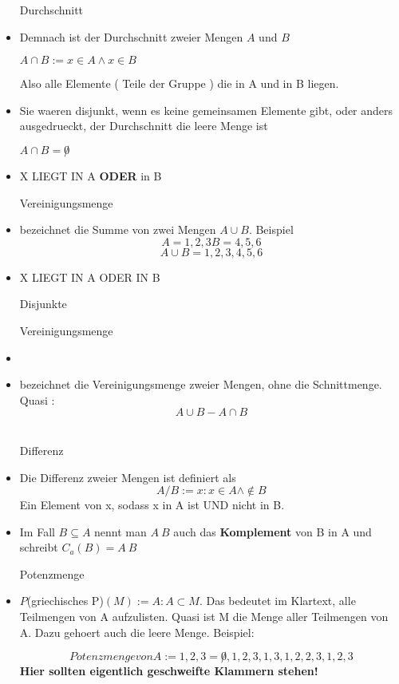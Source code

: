\documentclass[smallheadings,headsepline,12pt,a4paper]{scrartcl}
\begin{document}
\begin{itemize}
\item[Durchschnitt]
\item Demnach ist der Durchschnitt zweier Mengen $A$ und $B$ \\
\begin{center}
$ A \cap B := {x \in A \wedge x \in B } $
\end{center}
Also alle Elemente ( Teile der Gruppe ) die in A und in B liegen.
\item Sie waeren disjunkt, wenn es keine gemeinsamen Elemente gibt, oder anders ausgedrueckt, der Durchschnitt die leere Menge ist
\begin{center}
$ A \cap B = \not 0 $
\end{center}
\item X LIEGT IN A \textbf{ODER} in B 

\item[Vereinigungsmenge]
\item bezeichnet die Summe von zwei Mengen $ A \cup B $. Beispiel $$ A = {1,2,3} B = {4,5,6} $$
$$ A \cup B = {1,2,3,4,5,6} $$
\item X LIEGT IN A ODER IN B 

\item[Disjunkte]
\item[Vereinigungsmenge] 
\item 
\item bezeichnet die Vereinigungsmenge zweier Mengen, ohne die Schnittmenge. Quasi : 
$$ A \cup B - A \cap B $$ \\

\item[Differenz]
\item Die Differenz zweier Mengen ist definiert als $$ A / B := { x : x \in A \wedge \not \in B} $$
Ein Element von x, sodass x in A ist UND nicht in B.\\
\item Im Fall $ B \subseteq A $ nennt man $A \ B$ auch das \textbf{Komplement} von B in A und schreibt $C_a(B) = A \ B$
 

\item[Potenzmenge]
\item $P$(griechisches P)$(M):= {A: A \subset M}$. Das bedeutet im Klartext, alle Teilmengen von A aufzulisten. Quasi ist M die Menge aller Teilmengen von A. Dazu gehoert auch die leere Menge. Beispiel:

$$ Potenzmenge von A:= {1,2,3} = {\not 0, 1,2,3, {1,3},{1,2}, {2,3},{1,2,3} }$$ \textbf{Hier sollten eigentlich geschweifte Klammern stehen!}


\end{itemize}
\end{document}
